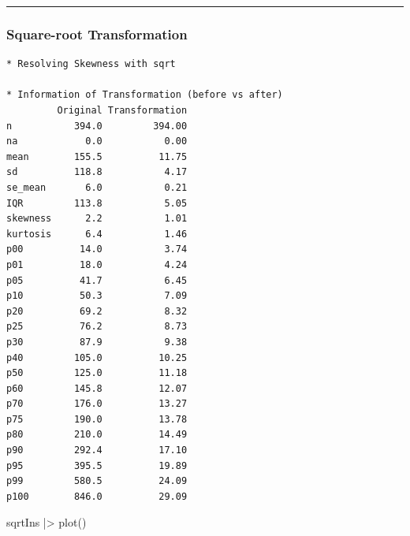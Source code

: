 \documentclass[
  letterpaper,
  DIV=11,
  numbers=noendperiod]{scrreprt}
\newenvironment{Shaded}{\begin{snugshade}}{\end{snugshade}}
\newcommand{\AttributeTok}[1]{\textcolor[rgb]{0.40,0.45,0.13}{#1}}
\newcommand{\FunctionTok}[1]{\textcolor[rgb]{0.28,0.35,0.67}{#1}}
\newcommand{\NormalTok}[1]{\textcolor[rgb]{0.00,0.23,0.31}{#1}}
\newcommand{\OtherTok}[1]{\textcolor[rgb]{0.00,0.23,0.31}{#1}}
\newcommand{\SpecialCharTok}[1]{\textcolor[rgb]{0.37,0.37,0.37}{#1}}
\newcommand{\StringTok}[1]{\textcolor[rgb]{0.13,0.47,0.30}{#1}}
\begin{document}
\begin{center}\rule{0.5\linewidth}{0.5pt}\end{center}

\hypertarget{square-root-transformation}{%
\subsubsection{Square-root
Transformation}\label{square-root-transformation}}

\begin{Shaded}
\end{Shaded}

\begin{verbatim}
* Resolving Skewness with sqrt

* Information of Transformation (before vs after)
         Original Transformation
n           394.0         394.00
na            0.0           0.00
mean        155.5          11.75
sd          118.8           4.17
se_mean       6.0           0.21
IQR         113.8           5.05
skewness      2.2           1.01
kurtosis      6.4           1.46
p00          14.0           3.74
p01          18.0           4.24
p05          41.7           6.45
p10          50.3           7.09
p20          69.2           8.32
p25          76.2           8.73
p30          87.9           9.38
p40         105.0          10.25
p50         125.0          11.18
p60         145.8          12.07
p70         176.0          13.27
p75         190.0          13.78
p80         210.0          14.49
p90         292.4          17.10
p95         395.5          19.89
p99         580.5          24.09
p100        846.0          29.09
\end{verbatim}

\begin{Shaded}
\begin{Highlighting}[]
\NormalTok{sqrtIns }\SpecialCharTok{|\textgreater{}}
  \FunctionTok{plot}\NormalTok{()}
\end{Highlighting}
\end{Shaded}
\end{document}

